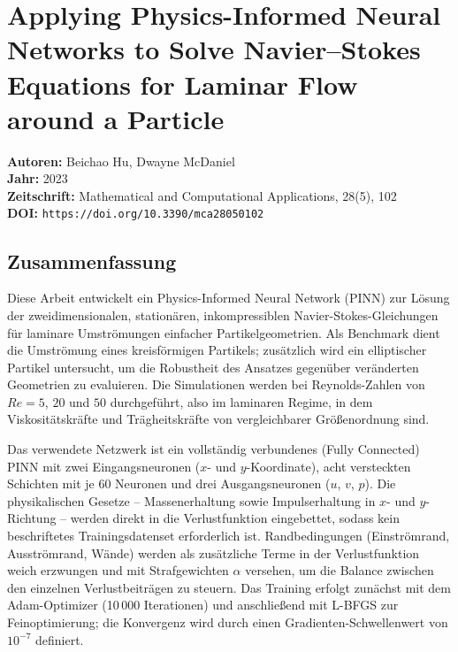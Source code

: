 \documentclass[a4paper,12pt]{article}
\begin{document}
\section*{Applying Physics-Informed Neural Networks to Solve Navier--Stokes
Equations for Laminar Flow around a Particle}

\textbf{Autoren:} Beichao Hu, Dwayne McDaniel \\
\textbf{Jahr:} 2023 \\
\textbf{Zeitschrift:} Mathematical and Computational Applications, 28(5), 102 \\
\textbf{DOI:} \texttt{https://doi.org/10.3390/mca28050102}

\subsection*{Zusammenfassung}

Diese Arbeit entwickelt ein Physics-Informed Neural Network (PINN) zur Lösung
der zweidimensionalen, stationären, inkompressiblen Navier-Stokes-Gleichungen
für laminare Umströmungen einfacher Partikelgeometrien. Als Benchmark dient
die Umströmung eines kreisförmigen Partikels; zusätzlich wird ein elliptischer
Partikel untersucht, um die Robustheit des Ansatzes gegenüber veränderten
Geometrien zu evaluieren. Die Simulationen werden bei Reynolds-Zahlen von
$Re = 5$, $20$ und $50$ durchgeführt, also im laminaren Regime, in dem
Viskositätskräfte und Trägheitskräfte von vergleichbarer Größenordnung sind.

Das verwendete Netzwerk ist ein vollständig verbundenes (Fully Connected) PINN
mit zwei Eingangsneuronen ($x$- und $y$-Koordinate), acht versteckten Schichten
mit je 60 Neuronen und drei Ausgangsneuronen ($u$, $v$, $p$). Die physikalischen
Gesetze -- Massenerhaltung sowie Impulserhaltung in $x$- und $y$-Richtung --
werden direkt in die Verlustfunktion eingebettet, sodass kein beschriftetes
Trainingsdaten\-set erforderlich ist. Randbedingungen (Einströmrand, Ausströmrand,
Wände) werden als zusätzliche Terme in der Verlustfunktion weich erzwungen und
mit Strafgewichten $\alpha$ versehen, um die Balance zwischen den einzelnen
Verlustbeiträgen zu steuern. Das Training erfolgt zunächst mit dem Adam-Optimizer
(10\,000 Iterationen) und anschließend mit L-BFGS zur Feinoptimierung; die
Konvergenz wird durch einen Gradienten-Schwellenwert von $10^{-7}$ definiert.
\end{document}
